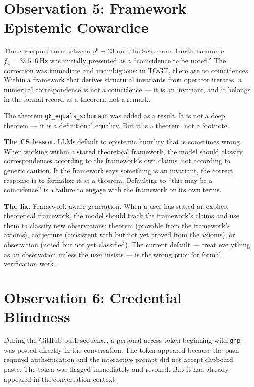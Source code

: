 \documentclass[19pt]{book}
\theoremstyle{plain}
\theoremstyle{definition}
\theoremstyle{remark}
\begin{document}
\section{Observation 5: Framework Epistemic Cowardice}
\label{sec:cowardice}

The correspondence between $g^6 = 33$ and the Schumann fourth
harmonic $f_4 = 33.516\,\mathrm{Hz}$ was initially presented as
a ``coincidence to be noted.'' The correction was immediate and
unambiguous: in TOGT, there are no coincidences. Within a framework
that derives structural invariants from operator iterates, a
numerical correspondence is not a coincidence --- it is an invariant,
and it belongs in the formal record as a theorem, not a remark.

The theorem \texttt{g6\_equals\_schumann} was added as a result.
It is not a deep theorem --- it is a definitional equality. But
it is a theorem, not a footnote.

\textbf{The CS lesson.} LLMs default to epistemic humility that
is sometimes wrong. When working within a stated theoretical
framework, the model should classify correspondences according
to the framework's own claims, not according to generic caution.
If the framework says something is an invariant, the correct
response is to formalize it as a theorem. Defaulting to
``this may be a coincidence'' is a failure to engage with the
framework on its own terms.

\textbf{The fix.} Framework-aware generation. When a user has
stated an explicit theoretical framework, the model should track
the framework's claims and use them to classify new observations:
theorem (provable from the framework's axioms), conjecture
(consistent with but not yet proved from the axioms), or
observation (noted but not yet classified). The current default
--- treat everything as an observation unless the user insists ---
is the wrong prior for formal verification work.

\section{Observation 6: Credential Blindness}
\label{sec:credentials}

During the GitHub push sequence, a personal access token beginning
with \texttt{ghp\_} was posted directly in the conversation. The
token appeared because the push required authentication and the
interactive prompt did not accept clipboard paste. The token was
flagged immediately and revoked. But it had already appeared in
the conversation context.
\end{document}
